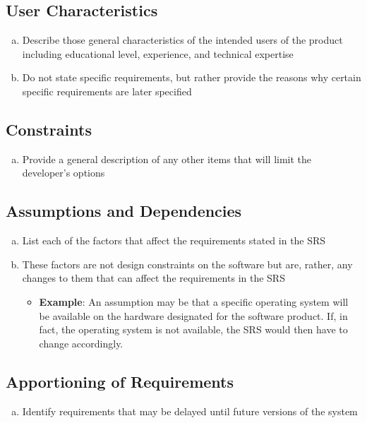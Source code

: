 \documentclass[]{article}
\begin{document}
\subsection{User Characteristics}
\label{sub:user_characteristics}
\begin{enumerate}[a)]
	\item Describe those general characteristics of the intended users of the product including educational level, experience, and technical expertise
	\item Do not state specific requirements, but rather provide the reasons why certain specific requirements are later specified
\end{enumerate}

\subsection{Constraints}
\label{sub:constraints}
\begin{enumerate}[a)]
	\item Provide a general description of any other items that will limit the developer's options
\end{enumerate}

\subsection{Assumptions and Dependencies}
\label{sub:assumptions_and_dependencies}
\begin{enumerate}[a)]
	\item List each of the factors that affect the requirements stated in the SRS
	\item These factors are not design constraints on the software but are, rather, any changes to them that can affect the requirements in the SRS
	\begin{itemize}
		\item \textbf{Example}: An assumption may be that a specific operating system will be available on the hardware designated for the software product. If, in fact, the operating system is not available, the SRS would then have to change accordingly.
	\end{itemize}
\end{enumerate}

\subsection{Apportioning of Requirements}
\label{sub:apportioning_of_requirements}
\begin{enumerate}[a)]
	\item Identify requirements that may be delayed until future versions of the system
\end{enumerate}
\end{document}
